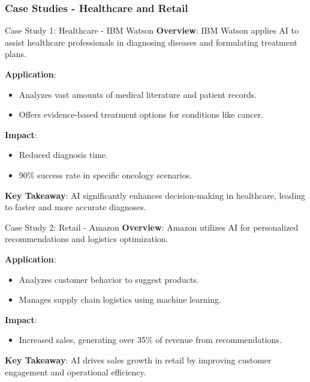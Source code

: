 \documentclass[aspectratio=169]{beamer}
\begin{document}
\begin{frame}[fragile]
    \frametitle{Case Studies - Healthcare and Retail}
    \begin{block}{Case Study 1: Healthcare - IBM Watson}
        \textbf{Overview}: 
        IBM Watson applies AI to assist healthcare professionals in diagnosing diseases and formulating treatment plans.
        
        \textbf{Application}:
        \begin{itemize}
            \item Analyzes vast amounts of medical literature and patient records.
            \item Offers evidence-based treatment options for conditions like cancer.
        \end{itemize}
        
        \textbf{Impact}:
        \begin{itemize}
            \item Reduced diagnosis time.
            \item 90\% success rate in specific oncology scenarios.
        \end{itemize}
        
        \textbf{Key Takeaway}: 
        AI significantly enhances decision-making in healthcare, leading to faster and more accurate diagnoses.
    \end{block}

    \begin{block}{Case Study 2: Retail - Amazon}
        \textbf{Overview}: 
        Amazon utilizes AI for personalized recommendations and logistics optimization.
        
        \textbf{Application}:
        \begin{itemize}
            \item Analyzes customer behavior to suggest products.
            \item Manages supply chain logistics using machine learning.
        \end{itemize}
        
        \textbf{Impact}:
        \begin{itemize}
            \item Increased sales, generating over 35\% of revenue from recommendations.
        \end{itemize}
        
        \textbf{Key Takeaway}: 
        AI drives sales growth in retail by improving customer engagement and operational efficiency.
    \end{block}
\end{frame}
\end{document}
